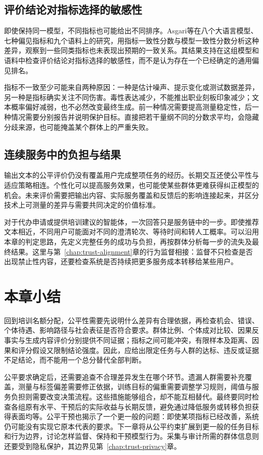 \subsection{评价结论对指标选择的敏感性}

即使保持同一模型，不同指标也可能给出不同排序。Asgari等在八个大语言模型、七种偏见指标和九个语料上的研究，用指标一致性分数与模型一致性分数分析这种差异，观察到一些同类指标也未表现出预期的一致关系。其结果支持在这组模型和语料中检查评价结论对指标选择的敏感性，而不是认为存在一个已经确定的通用偏见排名。

指标不一致至少可能来自两种原因：一种是估计噪声、提示变化或测试数据差异，另一种是指标确实关注不同伤害。毒性表达减少，不能推出职业刻板印象减少；文本概率偏好减弱，也不必然改变最终生成。前一种情况需要提高测量稳定性，后一种情况需要分别报告并说明保护目标。直接把若干量纲不同的分数求平均，会隐藏分歧来源，也可能掩盖某个群体上的严重失败。

\subsection{连续服务中的负担与结果}

输出文本的公平评价仍没有覆盖用户完成整项任务的经历。长期交互还使公平性与适应策略相连。个性化可以提高服务效果，也可能使某些群体更难获得纠正模型的机会。未来评价需要把输出内容、实际服务覆盖和反馈后的影响连接起来，并区分技术上可测量的差异与需要共同决定的价值标准。

对于代办申请或提供培训建议的智能体，一次回答只是服务链中的一步。即使推荐文本相近，不同用户可能面对不同的澄清轮次、等待时间和转人工概率。可以沿用本章的判定思路，先定义完整任务的成功与负担，再按群体分析每一步的流失及最终结果。这里与第~\ref{chap:trust-alignment}章的行为监督相接：监督不只检查是否出现禁止性内容，还要检查系统是否持续把更多服务成本转移给某些用户。

\section{本章小结}
\label{sec:fairness-summary}

回到培训名额分配，公平性需要先说明什么差异有合理依据，再检查机会、错误、个体待遇、影响路径与社会表征是否符合要求。群体比例、个体成对比较、因果反事实与生成内容评价分别提供不同证据；指标之间可能冲突，有限样本及距离、因果和评分假设又限制结论强度。因此，应给出限定任务与人群的达标、违反或证据不足结论，而不能用一个总分替代全部判断。

公平要求确定后，还需要追查不合理差异发生在哪个环节。遗漏人群需要补充覆盖，测量与标签偏差需要修正依据，训练目标的偏重需要调整学习规则，阈值与服务负担则需要改变决策流程。这些措施能够组合，却不能互相替代。最终要同时检查各组原有水平、干预后的实际收益与长期反馈，避免通过降低服务或转移负担获得表面均等。公平干预也揭示了一个更一般的问题：即使某项指标已经改善，系统仍可能没有实现它原本代表的要求。下一章将从公平约束扩展到更一般的任务目标和行为边界，讨论怎样监督、保持和干预模型行为。采集与审计所需的群体信息则还要受到隐私保护，其边界见第~\ref{chap:trust-privacy}章。

